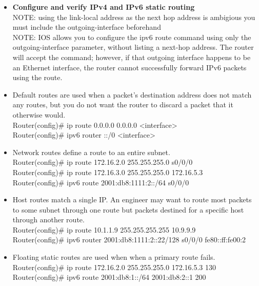 \documentclass{article}
\begin{document}
\begin{itemize}
  \item \textbf{Configure and verify IPv4 and IPv6 static routing}\\
  	NOTE: using the link-local address as the next hop address is ambigious you must include the outgoing-interface beforehand\\
  	NOTE: IOS allows you to configure the ipv6 route command using only the outgoing-interface parameter, without listing a next-hop address. The router will accept the command; however, if that outgoing interface happens to be an Ethernet interface, the router cannot successfully forward IPv6 packets using the route.
  	\item[] Default routes are used when a packet's destination address does not match any routes, but you do not want the router to discard a packet that it otherwise would.\\
  		Router(config)\# ip route 0.0.0.0 0.0.0.0 \textless interface\textgreater\\
  		Router(config)\# ipv6 router ::/0 \textless interface\textgreater
  	\item[] Network routes define a route to an entire subnet.\\
  		Router(config)\# ip route 172.16.2.0 255.255.255.0 s0/0/0\\
  		Router(config)\# ip route 172.16.3.0 255.255.255.0 172.16.5.3\\
  		Router(config)\# ipv6 route 2001:db8:1111:2::/64 s0/0/0
  	\item[] Host routes match a single IP. An engineer may want to route most packets to some subnet through one route but packets destined for a specific host through another route.\\
  		Router(config)\# ip route 10.1.1.9 255.255.255.255 10.9.9.9\\
  		Router(config)\# ipv6 router 2001:db8:1111:2::22/128 s0/0/0 fe80::ff:fe00:2
  	\item[] Floating static routes are used when when a primary route fails.\\
  		Router(config)\# ip route 172.16.2.0 255.255.255.0 172.16.5.3 130\\
  		Router(config)\# ipv6 route 2001:db8:1::/64 2001:db8:2::1 200
  		

\end{itemize}
\end{document}

